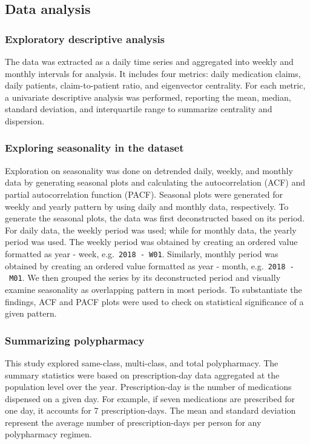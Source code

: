 \documentclass[
  authoryear,
  review]{elsarticle}
\begin{document}
\subsection{Data analysis}\label{data-analysis}

\subsubsection{Exploratory descriptive
analysis}\label{exploratory-descriptive-analysis}

The data was extracted as a daily time series and aggregated into weekly
and monthly intervals for analysis. It includes four metrics: daily
medication claims, daily patients, claim-to-patient ratio, and
eigenvector centrality. For each metric, a univariate descriptive
analysis was performed, reporting the mean, median, standard deviation,
and interquartile range to summarize centrality and dispersion.

\subsubsection{Exploring seasonality in the
dataset}\label{exploring-seasonality-in-the-dataset}

Exploration on seasonality was done on detrended daily, weekly, and
monthly data by generating seasonal plots and calculating the
autocorrelation (ACF) and partial autocorrelation function (PACF).
Seasonal plots were generated for weekly and yearly pattern by using
daily and monthly data, respectively. To generate the seasonal plots,
the data was first deconstructed based on its period. For daily data,
the weekly period was used; while for monthly data, the yearly period
was used. The weekly period was obtained by creating an ordered value
formatted as year - week, e.g.~\texttt{2018\ -\ W01}. Similarly, monthly
period was obtained by creating an ordered value formatted as year -
month, e.g.~\texttt{2018\ -\ M01}. We then grouped the series by its
deconstructed period and visually examine seasonality as overlapping
pattern in most periods. To substantiate the findings, ACF and PACF
plots were used to check on statistical significance of a given pattern.

\subsubsection{Summarizing polypharmacy}\label{summarizing-polypharmacy}

This study explored same-class, multi-class, and total polypharmacy. The
summary statistics were based on prescription-day data aggregated at the
population level over the year. Prescription-day is the number of
medications dispensed on a given day. For example, if seven medications
are prescribed for one day, it accounts for 7 prescription-days. The
mean and standard deviation represent the average number of
prescription-days per person for any polypharmacy regimen.
\end{document}

